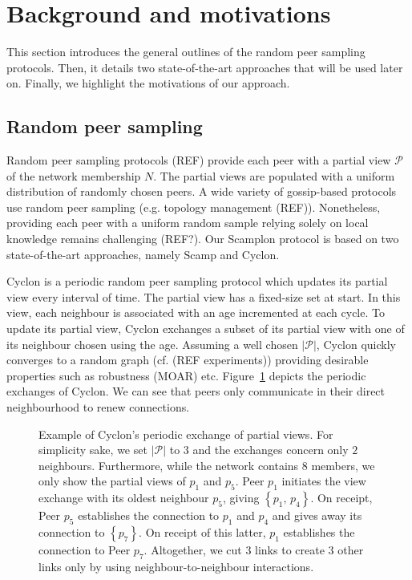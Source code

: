 
\section{Background and motivations}
\label{sec:background}

This section introduces the general outlines of the random peer sampling
protocols. Then, it details two state-of-the-art approaches that will be used
later on. Finally, we highlight the motivations of our approach.

\subsection{Random peer sampling}
Random peer sampling protocols (REF) provide each peer with a partial view
$\mathcal{P}$ of the network membership $N$. The partial views are populated
with a uniform distribution of randomly chosen peers. A wide variety of
gossip-based protocols use random peer sampling (e.g. topology management
(REF)). Nonetheless, providing each peer with a uniform random sample relying
solely on local knowledge remains challenging (REF?).  Our Scamplon protocol is
based on two state-of-the-art approaches, namely Scamp and Cyclon.

\begin{asparadesc}
\item [Cyclon]\cite{voulgaris2005cyclon} is a periodic random peer sampling
  protocol which updates its partial view every interval of time. The partial
  view has a fixed-size set at start. In this view, each neighbour is
  associated with an age incremented at each cycle. To update its partial view,
  Cyclon exchanges a subset of its partial view with one of its neighbour
  chosen using the age.  Assuming a well chosen $|\mathcal{P}|$, Cyclon quickly
  converges to a random graph (cf. (REF experiments)) providing desirable
  properties such as robustness (MOAR) etc.  Figure~\ref{fig:cyclonexample}
  depicts the periodic exchanges of Cyclon. We can see that peers only
  communicate in their direct neighbourhood to renew connections.
\end{asparadesc}

\begin{figure}
  \centering
  
  \caption{\label{fig:cyclonexample}Example of Cyclon's periodic exchange of
    partial views. For simplicity sake, we set $|\mathcal{P}|$ to $3$ and the
    exchanges concern only $2$ neighbours. Furthermore, while the network
    contains $8$ members, we only show the partial views of $p_1$ and $p_5$.
    Peer $p_1$ initiates the view exchange with its oldest neighbour $p_5$,
    giving $\left\{p_1,\,p_4\right\}$. On receipt, Peer $p_5$ establishes the
    connection to $p_1$ and $p_4$ and gives away its connection to
    $\left\{p_7\right\}$.  On receipt of this latter, $p_1$ establishes the
    connection to Peer $p_7$. Altogether, we cut $3$ links to create $3$ other
    links only by using neighbour-to-neighbour interactions.}
\end{figure}

